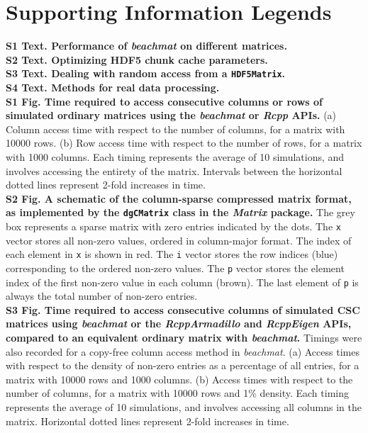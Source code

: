 \documentclass[10pt,letterpaper]{article}
\newcommand{\beachmat}{\textit{beachmat}}
\begin{document}


\section*{Supporting Information Legends}

\textbf{S1 Text. Performance of \beachmat{} on different matrices.} 
\\[0.05in]

\noindent
\textbf{S2 Text. Optimizing HDF5 chunk cache parameters.} 
\\[0.05in]

\noindent
\textbf{S3 Text. Dealing with random access from a \texttt{HDF5Matrix}.} 
\\[0.05in]

\noindent
\textbf{S4 Text. Methods for real data processing.} 
\\[0.05in]

\noindent
\textbf{S1 Fig. Time required to access consecutive columns or rows of simulated ordinary matrices using the \beachmat{} or \textit{Rcpp} APIs.}
(a) Column access time with respect to the number of columns, for a matrix with 10000 rows.
(b) Row access time with respect to the number of rows, for a matrix with 1000 columns.
Each timing represents the average of 10 simulations, and involves accessing the entirety of the matrix.
Intervals between the horizontal dotted lines represent 2-fold increases in time.
\\[0.05in]

\noindent
\textbf{S2 Fig. A schematic of the column-sparse compressed matrix format, as implemented by the \texttt{dgCMatrix} class in the \textit{Matrix} package.}
The grey box represents a sparse matrix with zero entries indicated by the dots.
The \texttt{x} vector stores all non-zero values, ordered in column-major format.
The index of each element in \texttt{x} is shown in red.
The \texttt{i} vector stores the row indices (blue) corresponding to the ordered non-zero values.
The \texttt{p} vector stores the element index of the first non-zero value in each column (brown).
The last element of \texttt{p} is always the total number of non-zero entries.
\\[0.05in]

\noindent
\textbf{S3 Fig. Time required to access consecutive columns of simulated CSC matrices using \beachmat{} or the \textit{RcppArmadillo} and \textit{RcppEigen} APIs, compared to an equivalent ordinary matrix with \beachmat{}.}
Timings were also recorded for a copy-free column access method in \beachmat{}.
(a) Access times with respect to the density of non-zero entries as a percentage of all entries, for a matrix with 10000 rows and 1000 columns.
(b) Access times with respect to the number of columns, for a matrix with 10000 rows and 1\% density.
Each timing represents the average of 10 simulations, and involves accessing all columns in the matrix.
Horizontal dotted lines represent 2-fold increases in time.
\\[0.05in]
\end{document}
